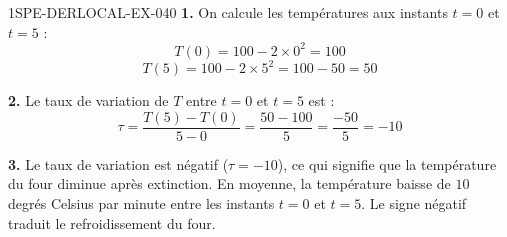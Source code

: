 \begin{corrige}{1SPE-DERLOCAL-EX-040}
\textbf{1.} On calcule les températures aux instants $t = 0$ et $t = 5$ :
\[
T(0) = 100 - 2 \times 0^2 = 100
\]
\[
T(5) = 100 - 2 \times 5^2 = 100 - 50 = 50
\]

\textbf{2.} Le taux de variation de $T$ entre $t = 0$ et $t = 5$ est :
\[
\tau = \frac{T(5) - T(0)}{5 - 0} = \frac{50 - 100}{5} = \frac{-50}{5} = -10
\]

\textbf{3.} Le taux de variation est négatif ($\tau = -10$), ce qui signifie que la température du four diminue après extinction. En moyenne, la température baisse de $\boxed{10}$ degrés Celsius par minute entre les instants $t = 0$ et $t = 5$. Le signe négatif traduit le refroidissement du four.
\end{corrige}
